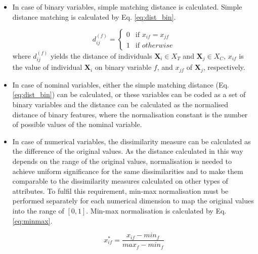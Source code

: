 		\begin{itemize}
			\item In case of binary variables, simple matching distance is calculated. Simple distance matching is calculated by Eq. \ref{eq:dist_bin}.
			      			      			      			      	      
			      \begin{equation}
			      	\label{eq:dist_bin}
			      	d_{ij}^{(f)}=
			      	\begin{cases} 
			      		0 & \text{if   } x_{if}=x_{jf} \\
			      		1 & \text{if   } otherwise     
			      	\end{cases} 
			      \end{equation}
			      \noindent where $d_{ij}^{(f)}$ yields the distance of individuals $\textbf{X}_i \in X_T$ and $\textbf{X}_j \in X_C$, $x_{if}$ is the value of individual $\textbf{X}_i$ on binary variable $f$, and $x_{jf}$ of $\textbf{X}_j$, respectively. 
			      			      			      			      	      
			\item In case of nominal variables, either the simple matching distance (Eq. \ref{eq:dist_bin}) can be calculated, or these variables can be coded as a set of binary variables and the distance can be calculated as the normalised distance of binary features, where the normalisation constant is the number of possible values of the nominal variable. 
			      			      			      			      	      
			\item In case of numerical variables, the dissimilarity measure can be calculated as the difference of the original values. As the distance calculated in this way depends on the range of the original values, normalisation is needed to achieve uniform significance for the same dissimilarities and to make them comparable to the dissimilarity measures calculated on other types of attributes. To fulfil this requirement, min-max normalisation must be performed separately for each numerical dimension to map the original values into the range of $[0,1]$. Min-max normalisation is calculated by Eq. \ref{eq:minmax}.
			      			      			      			      	      
			      \begin{equation}
			      	\label{eq:minmax}
			      	x^{*}_{if}=\frac{x_{if}-min_f}{max_f-min_f}
			      \end{equation}
			      			                          

\end{itemize}
